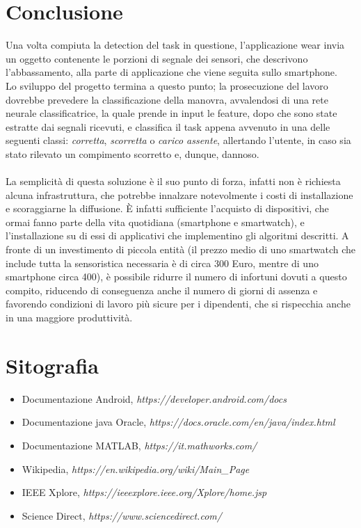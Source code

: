\documentclass[a4paper, oneside]{book}
\begin{document}
	\chapter{Conclusione}
Una volta compiuta la detection del task in questione, l'applicazione wear invia un oggetto contenente le porzioni di segnale dei sensori, che descrivono l'abbassamento, alla parte di applicazione che viene seguita sullo smartphone. \\
Lo sviluppo del progetto termina a questo punto; la prosecuzione del lavoro dovrebbe prevedere la classificazione della manovra, avvalendosi di una rete neurale classificatrice, la quale prende in input le feature, dopo che sono state estratte dai segnali ricevuti, e classifica il task appena avvenuto in una delle seguenti classi: \textit{corretta}, \textit{scorretta} o \textit{carico assente}, allertando l'utente, in caso sia stato rilevato un compimento scorretto e, dunque, dannoso. \\ \\
La semplicità di questa soluzione è il suo punto di forza, infatti non è richiesta alcuna infrastruttura, che potrebbe innalzare notevolmente i costi di installazione e scoraggiarne la diffusione. È infatti sufficiente l’acquisto di dispositivi, che ormai fanno parte della vita quotidiana (smartphone e smartwatch), e l’installazione su di essi di applicativi che implementino gli algoritmi descritti.
A fronte di un investimento di piccola entità (il prezzo medio di uno smartwatch che include tutta la sensoristica necessaria è di circa 300 Euro, mentre di uno smartphone circa 400), è possibile ridurre il numero di infortuni dovuti a questo compito, riducendo di conseguenza anche il numero di giorni di assenza e favorendo condizioni di lavoro più sicure per i dipendenti, che si rispecchia anche in una maggiore produttività.

\clearpage



\clearpage
	\chapter{Sitografia}

\begin{itemize}
\item Documentazione Android, \textit{https://developer.android.com/docs}
\item Documentazione java Oracle, \textit{https://docs.oracle.com/en/java/index.html}
\item Documentazione MATLAB, \textit{https://it.mathworks.com/}
\item Wikipedia, \textit{https://en.wikipedia.org/wiki/Main\_Page}
\item IEEE Xplore, \textit{https://ieeexplore.ieee.org/Xplore/home.jsp}
\item Science Direct, \textit{https://www.sciencedirect.com/}
\end{itemize}
\end{document}
